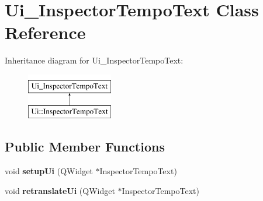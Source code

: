\hypertarget{class_ui___inspector_tempo_text}{}\section{Ui\+\_\+\+Inspector\+Tempo\+Text Class Reference}
\label{class_ui___inspector_tempo_text}
Inheritance diagram for Ui\+\_\+\+Inspector\+Tempo\+Text\+:\begin{figure}[H]
\begin{center}
\leavevmode
\includegraphics[height=2.000000cm]{class_ui___inspector_tempo_text}
\end{center}
\end{figure}
\subsection*{Public Member Functions}
\begin{DoxyCompactItemize}
\item 
\mbox{\label{class_ui___inspector_tempo_text_a29a57a28627e5e8410d90b124233554a}} 
void {\bfseries setup\+Ui} (Q\+Widget $\ast$Inspector\+Tempo\+Text)
\item 
\mbox{\label{class_ui___inspector_tempo_text_a2502d5e8decf240e7f0034316c5920a7}} 
void {\bfseries retranslate\+Ui} (Q\+Widget $\ast$Inspector\+Tempo\+Text)
\end{DoxyCompactItemize}
